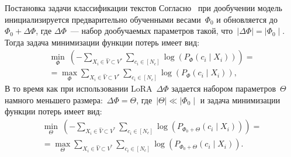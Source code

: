 \documentclass[9pt,pdf,hyperref={unicode}]{beamer}
\begin{document}
\begin{frame}[shrink=5]{Постановка задачи классификации текстов}
\justifying
Согласно~\cite{hu2021lora} при дообучении модель инициализируется предварительно обученными весами~$\Phi_0$ и обновляется до~$\Phi_0 + \Delta\Phi$, где $\Delta\Phi$~--- набор дообучаемых параметров такой, что~$\mid\Delta\Phi\mid = \mid\Phi_0\mid$. Тогда задача минимизации функции потерь имеет вид:
\begin{equation}
\label{eq:12} 
\begin{aligned}
\min _{\Phi}~(-\sum_{X_i \in \hat{V} \subset V^{*}} \sum_{c_i \in [N_c]} \log \left(P_{\Phi}\left(c_i \mid X_i\right)\right)) =\\ 
= \max _{\Phi} \sum_{X_i \in \hat{V} \subset V^{*}} \sum_{c_i \in [N_c]} \log \left(P_{\Phi}\left(c_i \mid X_i\right)\right),
\end{aligned}
\end{equation}
В то время как при использовании LoRA~$\Delta\Phi$ задается набором параметров~$\Theta$ намного меньшего размера:~$\Delta\Phi = \Theta$, где~$\mid\Theta\mid \ll \mid\Phi_0\mid$ и задача минимизации функции потерь имеет вид:
\begin{equation}
\label{eq:13}
\begin{aligned}
\min _{\Theta}~(-\sum_{X_i \in \hat{V} \subset V^{*}} \sum_{c_i \in [N_c]} \log \left(P_{\Phi_0+\Theta}\left(c_i \mid X_i\right)\right)) =\\
= \max _{\Theta} \sum_{X_i \in \hat{V} \subset V^{*}} \sum_{c_i \in [N_c]} \log \left(P_{\Phi_0+\Theta}\left(c_i \mid X_i\right)\right). 
\end{aligned}
\end{equation}

\end{frame}
\end{document}
